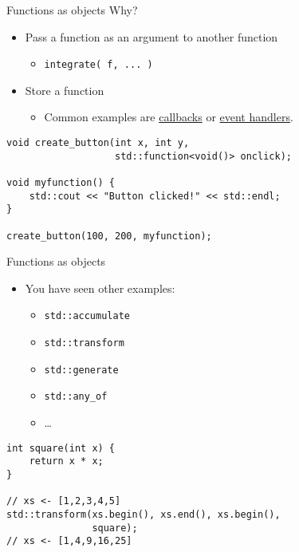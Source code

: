 \documentclass[10pt]{beamer}
\begin{document}
\begin{frame}[fragile,label={sec:org99a224c}]{Functions as objects}
 Why?

\begin{itemize}
\item Pass a function as an argument to another function
\begin{itemize}
\item \texttt{integrate( f, ... )}
\end{itemize}
\item Store a function
\begin{itemize}
\item Common examples are \uline{callbacks} or \uline{event handlers}.
\end{itemize}
\end{itemize}

\begin{verbatim}
void create_button(int x, int y,
                   std::function<void()> onclick);

void myfunction() {
    std::cout << "Button clicked!" << std::endl;
}

create_button(100, 200, myfunction);
\end{verbatim}
\end{frame}

\begin{frame}[fragile,label={sec:orgaa2fc43}]{Functions as objects}
 \begin{itemize}
\item You have seen other examples:
\begin{itemize}
\item \texttt{std::accumulate}
\item \texttt{std::transform}
\item \texttt{std::generate}
\item \texttt{std::any\_of}
\item \ldots{}
\end{itemize}
\end{itemize}

\begin{verbatim}
int square(int x) {
    return x * x;
}

// xs <- [1,2,3,4,5]
std::transform(xs.begin(), xs.end(), xs.begin(),
               square);
// xs <- [1,4,9,16,25]
\end{verbatim}
\end{frame}
\end{document}
